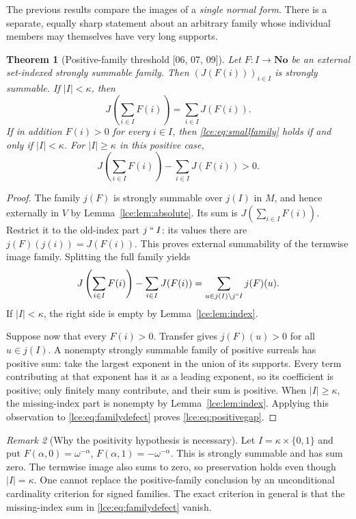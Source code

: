 \documentclass[11pt,letterpaper]{article}
\numberwithin{equation}{section}
\newtheorem{theorem}{Theorem}[section]
\theoremstyle{definition}
\theoremstyle{remark}
\newtheorem{remark}[theorem]{Remark}
\newcommand{\No}{\mathbf{No}}
\newcommand{\imset}[2]{#1\mathbin{``}#2}
\newcommand{\abs}[1]{\lvert#1\rvert}
\newcommand{\leref}[1]{Lemma~\ref{#1}}
\newcommand{\src}[1]{\textup{\textsf{\small[#1]}}}%
\begin{document}
The previous results compare the images of a \emph{single normal form}.
There is a separate, equally sharp statement about an arbitrary family
whose individual members may themselves have very long supports.

\begin{theorem}[Positive-family threshold \src{06, 07, 09}]\label{lce:thm:positive}
Let $F:I\to\No$ be an external set-indexed strongly summable family.
Then $(J(F(i)))_{i\in I}$ is strongly summable. If $\abs I<\kappa$, then
\begin{equation}\label{lce:eq:smallfamily}
 J\left(\sum_{i\in I}F(i)\right)=\sum_{i\in I}J(F(i)).
\end{equation}
If in addition $F(i)>0$ for every $i\in I$, then
\eqref{lce:eq:smallfamily} holds \emph{if and only if} $\abs I<\kappa$.
For $\abs I\ge\kappa$ in this positive case,
\begin{equation}\label{lce:eq:positivegap}
 J\left(\sum_{i\in I}F(i)\right)-\sum_{i\in I}J(F(i))>0.
\end{equation}
\end{theorem}
\begin{proof}
The family $j(F)$ is strongly summable over $j(I)$ in $M$, and hence
externally in $V$ by \leref{lce:lem:absolute}. Its sum is
$J(\sum_{i\in I}F(i))$. Restrict it to the old-index part $\imset jI$:
its values there are $j(F)(j(i))=J(F(i))$. This proves external
summability of the termwise image family. Splitting the full family yields
\begin{equation}\label{lce:eq:familydefect}
 J\left(\sum_{i\in I}F(i)\right)-\sum_{i\in I}J(F(i))
    =\sum_{u\in j(I)\setminus\imset jI}j(F)(u).
\end{equation}
If $\abs I<\kappa$, the right side is empty by \leref{lce:lem:index}.

Suppose now that every $F(i)>0$. Transfer gives $j(F)(u)>0$ for all
$u\in j(I)$. A nonempty strongly summable family of positive surreals has
positive sum: take the largest exponent in the union of its supports.
Every term contributing at that exponent has it as a leading exponent,
so its coefficient is positive; only finitely many contribute, and their
sum is positive. When $\abs I\ge\kappa$, the missing-index part is
nonempty by \leref{lce:lem:index}. Applying this observation to
\eqref{lce:eq:familydefect} proves \eqref{lce:eq:positivegap}.
\end{proof}

\begin{remark}[Why the positivity hypothesis is necessary]
Let $I=\kappa\times\{0,1\}$ and put
$F(\alpha,0)=\omega^{-\alpha}$,
$F(\alpha,1)=-\omega^{-\alpha}$. This is strongly summable and has sum
zero. The termwise image also sums to zero, so preservation holds even
though $\abs I=\kappa$. One cannot replace the positive-family conclusion
by an unconditional cardinality criterion for signed families.
The exact criterion in general is that the missing-index sum in
\eqref{lce:eq:familydefect} vanish.
\end{remark}
\end{document}
